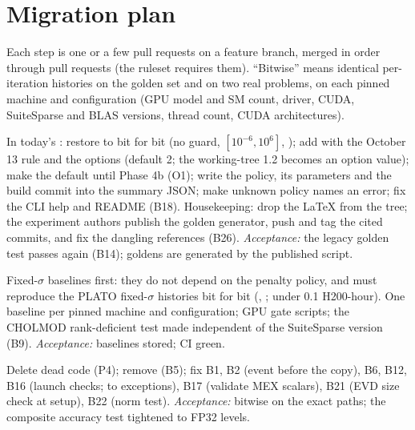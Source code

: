 \documentclass[11pt]{article}
\begin{document}
\section{Migration plan}\label{sec:migration}
Each step is one or a few pull requests on a feature branch, merged in order through pull requests (the
 ruleset requires them). ``Bitwise'' means identical per-iteration histories on the golden set and
on two real problems, on each pinned machine and configuration (GPU model and SM count, driver, CUDA,
SuiteSparse and BLAS versions, thread count, CUDA architectures).

\begin{description}[style=nextline,leftmargin=0.6cm]
\item[Pre-0 --- Names and housekeeping.] In today's : restore  to
 bit for bit (no guard, $[10^{-6},10^{6}]$, ); add  with the
October 13 rule and the options  (default 2; the working-tree 1.2 becomes an option
value); make  the default until Phase 4b (O1); write the policy, its parameters and the
build commit into the summary JSON; make unknown policy names an error; fix the CLI help and README (B18).
Housekeeping: drop the LaTeX  from the tree; the experiment authors publish the golden
generator, push and tag the cited commits, and fix the dangling references (B26).
\emph{Acceptance:} the legacy golden test passes again (B14);  goldens are generated
by the published script.
\item[Phase 0 --- Safety net.] Fixed-$\sigma$ baselines first: they do not depend on the penalty policy, and
 must reproduce the PLATO fixed-$\sigma$ histories bit for bit (, ; under
0.1 H200-hour). One baseline per pinned machine and configuration; GPU gate scripts; the CHOLMOD rank-deficient
test made independent of the SuiteSparse version (B9). \emph{Acceptance:} baselines stored; CI green.
\item[Phase 1 --- Cleanup and one-line fixes.] Delete dead code (P4); remove  (B5);
fix B1, B2 (event before the copy), B6, B12, B16 (launch checks;  to exceptions), B17 (validate
MEX scalars), B21 (EVD size check at setup), B22 (norm test). \emph{Acceptance:} bitwise on the exact paths;
the composite accuracy test tightened to FP32 levels.

\end{description}
\end{document}
